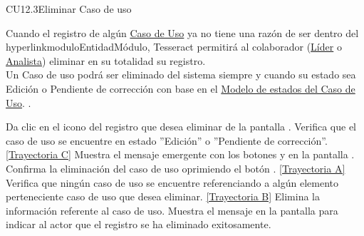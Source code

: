 	\begin{UseCase}{CU12.3}{Eliminar Caso de uso}{
	
		Cuando el registro de algún \hyperlink{casoUso}{Caso de Uso} ya no tiene una razón de ser dentro del hyperlink{moduloEntidad}{Módulo}, Tesseract permitirá al colaborador (\hyperlink{jefe}{Líder} o \hyperlink{analista}{Analista}) eliminar en su totalidad su registro. \\
	
		Un Caso de uso podrá ser eliminado del sistema siempre y cuando su estado sea Edición o Pendiente de corrección con base en el \hyperlink{edoCU}{Modelo de estados del Caso de Uso}.  .
}
	\end{UseCase}
	\begin{UCtrayectoria}
		\UCpaso[\UCactor] Da clic en el icono \eliminar del registro que desea eliminar de la pantalla .
		\UCpaso[\UCsist] Verifica que el caso de uso se encuentre en estado ''Edición'' o ''Pendiente de corrección''. \hyperlink{CU12-3:TAC}{[Trayectoria C]}
		\UCpaso[\UCsist] Muestra el mensaje emergente  con los botones  y  en la pantalla .
		\UCpaso[\UCactor] Confirma la eliminación del caso de uso oprimiendo el botón . \hyperlink{CU12-3:TAA}{[Trayectoria A]}
		\UCpaso[\UCsist] Verifica que ningún caso de uso se encuentre referenciando a algún elemento perteneciente caso de uso que desea eliminar. \hyperlink{CU12-3:TAB}{[Trayectoria B]}
		\UCpaso[\UCsist] Elimina la información referente al caso de uso.
		\UCpaso[\UCsist] Muestra el mensaje  en la pantalla  para indicar al actor que el registro se ha eliminado exitosamente.
	\end{UCtrayectoria}		
